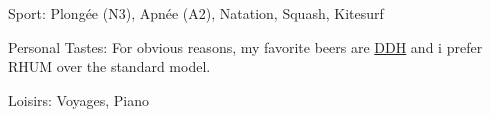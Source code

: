 Sport: Plongée (N3), Apnée (A2), Natation, Squash, Kitesurf\hfill

Personal Tastes: For obvious reasons, my favorite beers are \href{https://www.biermarket.fr/fr/163-ddh}{DDH} and i prefer RHUM over the standard model.

Loisirs: Voyages, Piano \hfill
